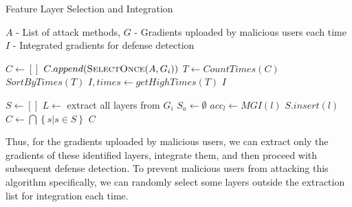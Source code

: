 \documentclass[conference]{IEEEtran}
\begin{document}
\begin{algorithm}
    \caption{Feature Layer Selection and Integration}
    \label{alg:featureLayerSelection}
    \begin{algorithmic}[1]
        \Require $A$ - List of attack methods, $G$ - Gradients uploaded by malicious users each time
        \Ensure $I$ - Integrated gradients for defense detection

            \State $C \gets \left [ \right ] $
                \State $C.append( \Call{SelectOnce}{A, G_i})$
            \EndFor
            \State $T \gets CountTimes(C)$
            \State $SortByTimes(T)$
            \State $I, times \gets getHighTimes(T)$
            \State \Return $I$
        \EndFunction

            \State $S \gets \left [  \right ] $
                \State $L \gets$ extract all layers from $G_i$
                \State $S_a \gets \emptyset$
                    \State $acc_l \gets MGI(l)$
                        \State $S.insert(l)$
                    \EndIf
                \EndFor
            \State $C \gets \bigcap\left \{ s | s\in S  \right \}$
            \EndFor
            \State \Return $C$
        \EndFunction


        


    \end{algorithmic}
\end{algorithm}


Thus, for the gradients uploaded by malicious users, we can extract only the gradients of these identified layers, integrate them, and then proceed with subsequent defense detection. To prevent malicious users from attacking this algorithm specifically, we can randomly select some layers outside the extraction list for integration each time.
\end{document}

